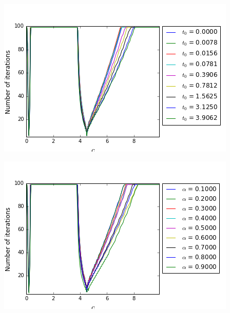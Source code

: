 \begingroup
\begin{minipage}{.5\linewidth}
\begin{center}
	\includegraphics[scale=.4]{figures/FinalFigures/NiterxCoefVarT0FinalVersionP.png}
\end{center}
\end{minipage}
\begin{minipage}{.5\linewidth}
\begin{center}
	\includegraphics[scale=.4]{figures/FinalFigures/NiterxCoefVarinterfaceFinalVersionP.png}
\end{center}
\end{minipage}
